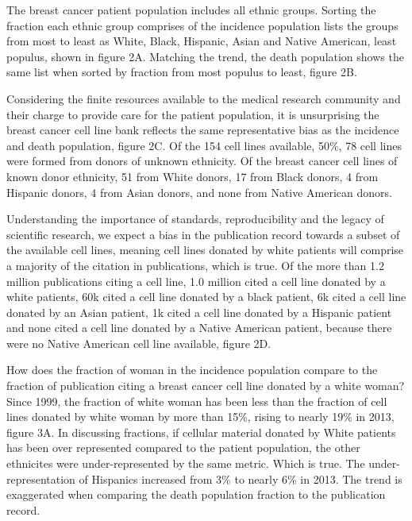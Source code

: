\documentclass[11pt]{article}
\begin{document}
The breast cancer patient population includes all ethnic groups. Sorting the fraction each ethnic group comprises of the incidence population lists the groups from most to least as White, Black, Hispanic, Asian and Native American, least populus, shown in figure 2A. Matching the trend, the death population shows the same list when sorted by fraction from most populus to least, figure 2B. 

Considering the finite resources available to the medical research community and their charge to provide care for the patient population, it is unsurprising the breast cancer cell line bank reflects the same representative bias as the incidence and death population, figure 2C. Of the 154 cell lines available, 50\%, 78 cell lines were formed from donors of unknown ethnicity. Of the breast cancer cell lines of known donor ethnicity, 51 from White donors, 17 from Black donors, 4 from Hispanic donors, 4 from Asian donors, and none from Native American donors. 

Understanding the  importance of standards, reproducibility and the legacy of scientific research, we expect a bias in the publication record towards a subset of the available cell lines, meaning cell lines donated by white patients will comprise a majority of the citation in publications, which is true. Of the more than 1.2 million publications citing a cell line, 1.0 million cited a cell line donated by a white patients, 60k cited a cell line donated by a black patient, 6k cited a cell line donated by an Asian patient, 1k cited a cell line donated by a Hispanic patient and none cited a cell line donated by a Native American patient, because there were no Native American cell line available, figure 2D.


How does the fraction of woman in the incidence population compare to the fraction of publication citing a breast cancer cell line donated by a white woman? Since 1999, the fraction of white woman has been less than the fraction of cell lines donated by white woman by more than 15\%, rising to nearly 19\% in 2013, figure 3A. In discussing fractions, if cellular material donated by White patients has been over represented compared to the patient population, the other ethnicites were under-represented by the same metric. Which is true. The under-representation of Hispanics increased from 3\% to nearly 6\% in 2013. The trend is exaggerated when comparing the death population fraction to the publication record. 
\end{document}
